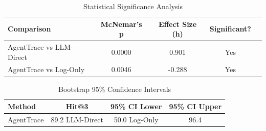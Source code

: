 
\begin{table}[t]
\centering
\caption{Statistical Significance Analysis}
\label{tab:statistical}
\begin{tabular}{lcccc}
\toprule
\textbf{Comparison} & \textbf{McNemar's p} & \textbf{Effect Size (h)} & \textbf{Significant?} \\
\midrule
AgentTrace vs LLM-Direct & 0.0000 & 0.901 & Yes \\
AgentTrace vs Log-Only & 0.0046 & -0.288 & Yes \\

\bottomrule
\end{tabular}
\end{table}

\begin{table}[t]
\centering
\caption{Bootstrap 95\% Confidence Intervals}
\label{tab:confidence_intervals}
\begin{tabular}{lccc}
\toprule
\textbf{Method} & \textbf{Hit@3} & \textbf{95\% CI Lower} & \textbf{95\% CI Upper} \\
\midrule
AgentTrace & 89.2%
LLM-Direct & 50.0%
Log-Only & 96.4%

\bottomrule
\end{tabular}
\end{table}
